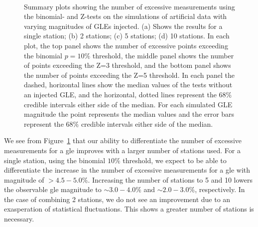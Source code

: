 \begin{figure}[!htbp!]
	 \\
	
	\caption{Summary plots showing the number of excessive measurements using the binomial- and Z-tests on the simulations of artificial data with varying magnitudes of GLEs injected. (a) Shows the results for a single station; (b) 2 stations; (c) 5 stations; (d) 10 stations. In each plot, the top panel shows the number of excessive points exceeding the binomial $p = 10 \%$ threshold, the middle panel shows the number of points exceeding the Z=3 threshold, and the bottom panel shows the number of points exceeding the Z=5 threshold. In each panel the dashed, horizontal lines show the median values of the tests without an injected GLE, and the horizontal, dotted lines represent the $68 \%$ credible intervals either side of the median. For each simulated GLE magnitude the point represents the median values and the error bars represent the $68 \%$ credible intervals either side of the median.}
	\label{fig:multi_HS14008_sims}
\end{figure}

We see from Figure~\ref{fig:multi_HS14008_sims} that our ability to differentiate the number of excessive measurements for a \gls{gle} improves with a larger number of stations used. For a single station, using the binomial $10 \%$ threshold, we expect to be able to differentiate the increase in the number of excessive measurements for a \gls{gle} with magnitude of $> 4.5 - 5.0 \%$. Increasing the number of stations to 5 and 10 lowers the observable \gls{gle} magnitude to $\sim 3.0 - 4.0 \%$ and $\sim 2.0 - 3.0 \%$, respectively. In the case of combining 2 stations, we do not see an improvement due to an exasperation of statistical fluctuations. This shows a greater number of stations is necessary.

